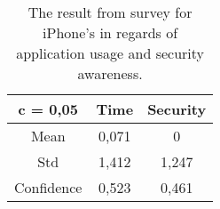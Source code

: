 \begin{table}[ht]
    \centering
    \begin{tabular}{ |c|c|c| } 
        \hline
        \rowcolor{light-gray}
        c = 0,05    & Time  &   Security\\
        \hline
        Mean    &	0,071   &	0 \\ 
        \hline
        Std     &  	1,412   &	1,247\\ 
        \hline
        Confidence  &	0,523   &	0,461 \\ 
        \hline
    \end{tabular}
    \caption{\label{tab:iPhone-survey}The result from survey for iPhone's in regards of application usage and security awareness.}
\end{table}